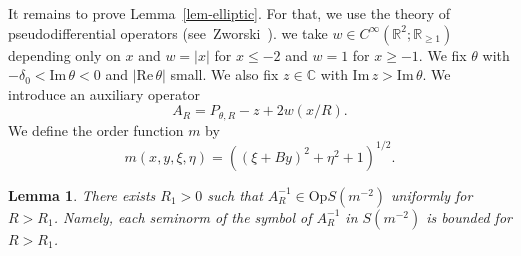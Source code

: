 \documentclass{article}
\theoremstyle{plain}
\newtheorem{lemma}[prop]{Lemma}
\theoremstyle{definition}
\theoremstyle{remark}
\newcommand{\RR}{\mathbb{R}}
\newcommand{\CC}{\mathbb{C}}
\newcommand{\Cinf}{C^{\infty}}
\newcommand{\RE}{\mathrm{Re}\,}
\newcommand{\IM}{\mathrm{Im}\,}
\begin{document}
It remains to prove Lemma~\ref{lem-elliptic}. 
For that, we use the theory of pseudodifferential operators (see~Zworski~\cite{Z}). 
we take $w \in  \Cinf(\RR^2; \RR_{\ge 1})$ depending only on $x$ and 
$w=|x|$ for $x \le -2$ and $w=1$ for $x \ge -1$. 
We fix $\theta$ with $-\delta_0<\IM \theta<0$ and $|\RE \theta|$ small. 
We also fix $z\in \CC$ with $\IM z>\IM \theta$. 
We introduce an auxiliary operator
\[
A_R=P_{\theta, R}-z+2w(x/R).
\]
We define the order function $m$ by 
\[
m(x, y, \xi, \eta)=((\xi+By)^2+\eta^2+1)^{1/2}.
\]

\begin{lemma}\label{lem-symbol}
There exists $R_1>0$ such that $A_R^{-1}\in \mathrm{Op}S(m^{-2})$ uniformly for $R>R_1$. 
Namely, each seminorm of the symbol of $A_R^{-1}$ in $S(m^{-2})$ is bounded for $R>R_1$. 
\end{lemma}
\end{document}
